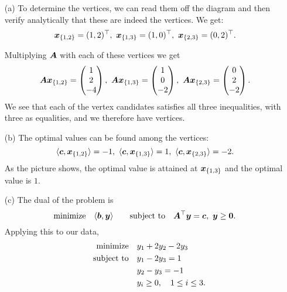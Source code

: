 \documentclass{article}
\begin{document}
\begin{itemize}
 \item[(a)] To determine the vertices, we can read them off the diagram and then verify analytically that these are indeed the vertices. We get:
 \begin{equation*}
 \vct{x}_{\{1,2\}} = (1,2)^{\trans}, \ \vct{x}_{\{1,3\}} = (1,0)^{\trans}, \ \vct{x}_{\{2,3\}} = (0,2)^{\trans}.
\end{equation*}
 
 Multiplying $\bm{A}$ with each of these vertices we get
 \begin{equation*}
\mtx{A}\vct{x}_{\{1,2\}} = \begin{pmatrix}
                              1\\2\\-4
                             \end{pmatrix}, \ 
                             \mtx{A}\vct{x}_{\{1,3\}} = \begin{pmatrix}
                              1\\0\\-2
                             \end{pmatrix}, \
  \mtx{A}\vct{x}_{\{2,3\}} = \begin{pmatrix}
                              0\\2\\-2
                             \end{pmatrix}.    
 \end{equation*}
 We see that each of the vertex candidates satisfies all three inequalities, with three as equalities, and we therefore have vertices. 
 \item[(b)] The optimal values can be found among the vertices:
 \begin{equation*}
  \ip{\vct{c}}{\vct{x}_{\{1,2\}}} = -1, \  \ip{\vct{c}}{\vct{x}_{\{1,3\}}} = 1, \ \ip{\vct{c}}{\vct{x}_{\{2,3\}}} = -2. 
 \end{equation*}
As the picture shows, the optimal value is attained at $\bm{x}_{\{1,3\}}$ and the optimal value is $1$.
 \item[(c)] The dual of the problem is
 \begin{equation*}
  \text{minimize}\quad \langle {\bm{b}}, {\bm{y}} \rangle \quad \quad\text{subject to}\quad \bm{A}^{\top}\bm{y}=\bm{c}, \ \bm{y}\geq \bm{0}.
 \end{equation*}
Applying this to our data,
\begin{align*}
\text{minimize}\quad & y_1+2y_2-2y_3\\
\quad\text{subject to}\quad & y_1-2y_3 = 1\\
& y_2-y_3 = -1\\
& y_i\geq 0, \quad 1\leq i\leq 3.
\end{align*}
\end{itemize}
\end{document}
